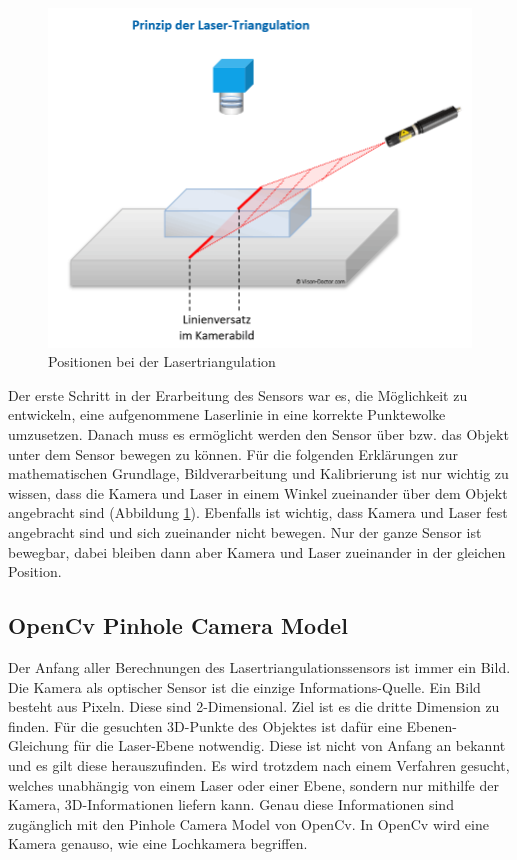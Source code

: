 	\newpage
	
	\begin{figure}[h]
		\centering
		\includegraphics[width=0.7\linewidth]{img/grundlagen/lasertriangulation_2}
		\caption{Positionen bei der Lasertriangulation}
		\label{fig:lasertriangulation_position}
	\end{figure}
	
	Der erste Schritt in der Erarbeitung des Sensors war es, die Möglichkeit zu entwickeln, eine aufgenommene Laserlinie in eine korrekte Punktewolke umzusetzen. Danach muss es ermöglicht werden den Sensor über bzw. das Objekt unter dem Sensor bewegen zu können. Für die folgenden Erklärungen zur mathematischen Grundlage, Bildverarbeitung und Kalibrierung ist nur wichtig zu wissen, dass die Kamera und Laser in einem Winkel zueinander über dem Objekt angebracht sind (Abbildung \ref{fig:lasertriangulation_position}). Ebenfalls ist wichtig, dass Kamera und Laser fest angebracht sind und sich zueinander nicht bewegen. Nur der ganze Sensor ist bewegbar, dabei bleiben dann aber Kamera und Laser zueinander in der gleichen Position.
	\label{chap:grundlegender_aufbau}
	
	\subsection{OpenCv Pinhole Camera Model}
	Der Anfang aller Berechnungen des Lasertriangulationssensors ist immer ein Bild. Die Kamera als optischer Sensor ist die einzige Informations-Quelle. Ein Bild besteht aus Pixeln. Diese sind 2-Dimensional. Ziel ist es die dritte Dimension zu finden. Für die gesuchten 3D-Punkte des Objektes ist dafür eine Ebenen-Gleichung für die Laser-Ebene notwendig. Diese ist nicht von Anfang an bekannt und es gilt diese herauszufinden. Es wird trotzdem nach einem Verfahren gesucht, welches unabhängig von einem Laser oder einer Ebene, sondern nur mithilfe der Kamera, 3D-Informationen liefern kann. Genau diese Informationen sind zugänglich mit den Pinhole Camera Model von OpenCv. In OpenCv wird eine Kamera genauso, wie eine Lochkamera begriffen.
	
